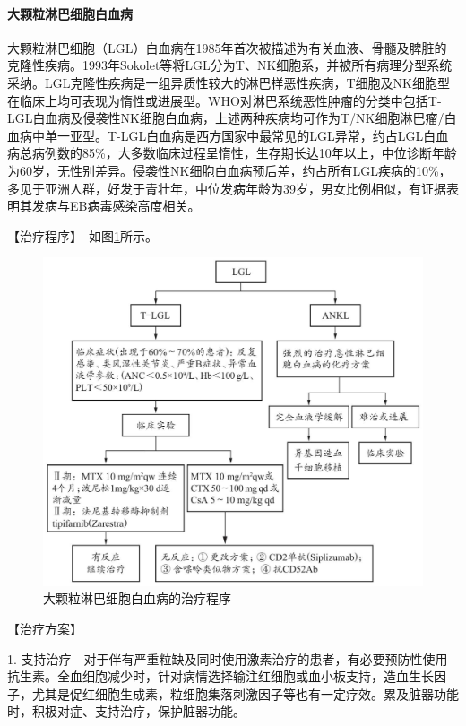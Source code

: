 \paragraph{大颗粒淋巴细胞白血病}

大颗粒淋巴细胞（LGL）白血病在1985年首次被描述为有关血液、骨髓及脾脏的克隆性疾病。1993年Sokolet等将LGL分为T、NK细胞系，并被所有病理分型系统采纳。LGL克隆性疾病是一组异质性较大的淋巴样恶性疾病，T细胞及NK细胞型在临床上均可表现为惰性或进展型。WHO对淋巴系统恶性肿瘤的分类中包括T-LGL白血病及侵袭性NK细胞白血病，上述两种疾病均可作为T/NK细胞淋巴瘤/白血病中单一亚型。T-LGL白血病是西方国家中最常见的LGL异常，约占LGL白血病总病例数的85\%，大多数临床过程呈惰性，生存期长达10年以上，中位诊断年龄为60岁，无性别差异。侵袭性NK细胞白血病预后差，约占所有LGL疾病的10\%，多见于亚洲人群，好发于青壮年，中位发病年龄为39岁，男女比例相似，有证据表明其发病与EB病毒感染高度相关。

【治疗程序】　如图\ref{fig5-1-15}所示。

\begin{figure}[!htbp]
 \centering
 \includegraphics{./images/Image00148.jpg}
 \captionsetup{justification=centering}
 \caption{大颗粒淋巴细胞白血病的治疗程序}
 \label{fig5-1-15}
  \end{figure} 

【治疗方案】

1.
支持治疗　对于伴有严重粒缺及同时使用激素治疗的患者，有必要预防性使用抗生素。全血细胞减少时，针对病情选择输注红细胞或血小板支持，造血生长因子，尤其是促红细胞生成素，粒细胞集落刺激因子等也有一定疗效。累及脏器功能时，积极对症、支持治疗，保护脏器功能。

